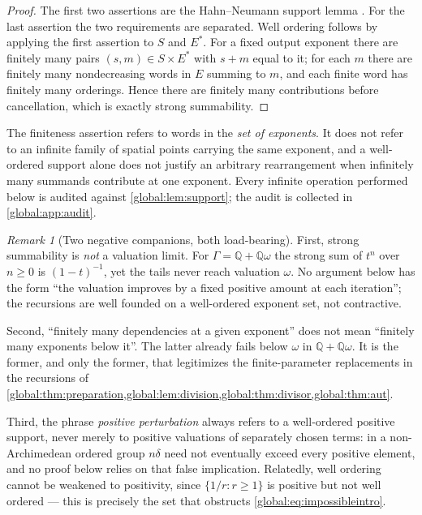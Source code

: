 \documentclass[11pt,letterpaper]{article}
\theoremstyle{definition}
\theoremstyle{remark}
\newtheorem{remark}[remark]{Remark}
\newcommand{\Q}{\mathbb Q}
\numberwithin{equation}{section}
\begin{document}
\begin{proof}
The first two assertions are the Hahn--Neumann support lemma \cite{Neumann,Poonen}. For the last assertion the two requirements are separated. Well ordering follows by applying the first assertion to $S$ and $E^*$. For a fixed output exponent there are finitely many pairs $(s,m)\in S\times E^*$ with $s+m$ equal to it; for each $m$ there are finitely many nondecreasing words in $E$ summing to $m$, and each finite word has finitely many orderings. Hence there are finitely many contributions before cancellation, which is exactly strong summability.
\end{proof}

The finiteness assertion refers to words in the \emph{set of exponents}. It does not refer to an infinite family of spatial points carrying the same exponent, and a well-ordered support alone does not justify an arbitrary rearrangement when infinitely many summands contribute at one exponent. Every infinite operation performed below is audited against \cref{global:lem:support}; the audit is collected in \cref{global:app:audit}.

\begin{remark}[Two negative companions, both load-bearing]\label{global:rem:nonarch}
First, strong summability is \emph{not} a valuation limit. For $\Gamma=\Q+\Q\omega$ the strong sum of $t^n$ over $n\ge0$ is $(1-t)^{-1}$, yet the tails never reach valuation $\omega$. No argument below has the form ``the valuation improves by a fixed positive amount at each iteration''; the recursions are well founded on a well-ordered exponent set, not contractive.

Second, ``finitely many dependencies at a given exponent'' does not mean ``finitely many exponents below it''. The latter already fails below $\omega$ in $\Q+\Q\omega$. It is the former, and only the former, that legitimizes the finite-parameter replacements in the recursions of \cref{global:thm:preparation,global:lem:division,global:thm:divisor,global:thm:aut}.

Third, the phrase \emph{positive perturbation} always refers to a well-ordered positive support, never merely to positive valuations of separately chosen terms: in a non-Archimedean ordered group $n\delta$ need not eventually exceed every positive element, and no proof below relies on that false implication. Relatedly, well ordering cannot be weakened to positivity, since $\{1/r:r\ge1\}$ is positive but not well ordered --- this is precisely the set that obstructs \eqref{global:eq:impossibleintro}.
\end{remark}
\end{document}
